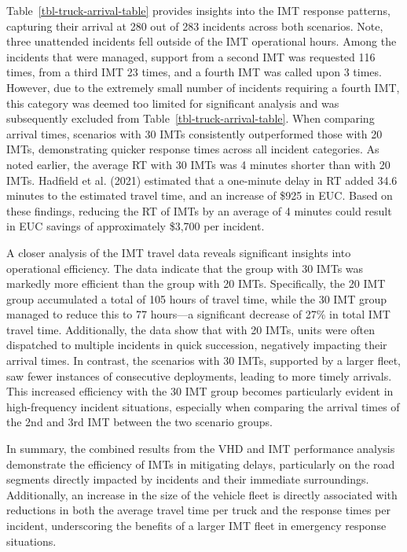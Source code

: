 \documentclass[fancy, oneside, mastersfancy, ms]{byuthesis}
\begin{document}
Table~\ref{tbl-truck-arrival-table} provides insights into the IMT
response patterns, capturing their arrival at 280 out of 283 incidents
across both scenarios. Note, three unattended incidents fell outside of
the IMT operational hours. Among the incidents that were managed,
support from a second IMT was requested 116 times, from a third IMT 23
times, and a fourth IMT was called upon 3 times. However, due to the
extremely small number of incidents requiring a fourth IMT, this
category was deemed too limited for significant analysis and was
subsequently excluded from Table~\ref{tbl-truck-arrival-table}. When
comparing arrival times, scenarios with 30 IMTs consistently
outperformed those with 20 IMTs, demonstrating quicker response times
across all incident categories. As noted earlier, the average RT with 30
IMTs was 4 minutes shorter than with 20 IMTs. Hadfield et al. (2021)
estimated that a one-minute delay in RT added 34.6 minutes to the
estimated travel time, and an increase of \$925 in EUC. Based on these
findings, reducing the RT of IMTs by an average of 4 minutes could
result in EUC savings of approximately \$3,700 per incident.

A closer analysis of the IMT travel data reveals significant insights
into operational efficiency. The data indicate that the group with 30
IMTs was markedly more efficient than the group with 20 IMTs.
Specifically, the 20 IMT group accumulated a total of 105 hours of
travel time, while the 30 IMT group managed to reduce this to 77
hours---a significant decrease of 27\% in total IMT travel time.
Additionally, the data show that with 20 IMTs, units were often
dispatched to multiple incidents in quick succession, negatively
impacting their arrival times. In contrast, the scenarios with 30 IMTs,
supported by a larger fleet, saw fewer instances of consecutive
deployments, leading to more timely arrivals. This increased efficiency
with the 30 IMT group becomes particularly evident in high-frequency
incident situations, especially when comparing the arrival times of the
2nd and 3rd IMT between the two scenario groups.

In summary, the combined results from the VHD and IMT performance
analysis demonstrate the efficiency of IMTs in mitigating delays,
particularly on the road segments directly impacted by incidents and
their immediate surroundings. Additionally, an increase in the size of
the vehicle fleet is directly associated with reductions in both the
average travel time per truck and the response times per incident,
underscoring the benefits of a larger IMT fleet in emergency response
situations.
\end{document}
